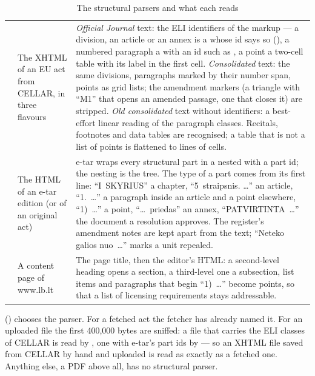 \begin{table}[H]
\caption{The structural parsers and what each reads}\label{tab:corpus:parsers}
\begin{tabularx}{\textwidth}{@{}L{20mm}L{35mm}Y@{}}
\toprule
{} &  &  \\
\midrule
{} & The XHTML of an EU act from CELLAR, in three flavours & \emph{Official Journal} text: the ELI identifiers of the markup --- a division, an article or an annex is a  whose id says so (), a numbered paragraph a  with an id such as , a point a two-cell table with its label in the first cell. \emph{Consolidated} text: the same divisions, paragraphs marked by their number span, points as grid lists; the amendment markers (a triangle with \enquote{M1} that opens an amended passage, one that closes it) are stripped. \emph{Old consolidated} text without identifiers: a best-effort linear reading of the paragraph classes. Recitals, footnotes and data tables are recognised; a table that is not a list of points is flattened to lines of cells. \\
 & The HTML of an e-tar edition (or of an original act) & e-tar wraps every structural part in a nested  with a part id; the nesting is the tree. The type of a part comes from its first line: \enquote{I~SKYRIUS} a chapter, \enquote{5~straipsnis. …} an article, \enquote{1.~…} a paragraph inside an article and a point elsewhere, \enquote{1)~…} a point, \enquote{…~priedas} an annex, \enquote{PATVIRTINTA~…} the document a resolution approves. The register's amendment notes are kept apart from the text; \enquote{Neteko galios nuo~…} marks a unit repealed. \\
 & A content page of www.lb.lt & The page title, then the editor's HTML: a second-level heading opens a section, a third-level one a subsection, list items and paragraphs that begin \enquote{1)~…} become points, so that a list of licensing requirements stays addressable. \\
\bottomrule
\end{tabularx}
\end{table}

 () chooses the parser. For a fetched act
the fetcher has already named it. For an uploaded file the first 400,000 bytes are sniffed: a
file that carries the ELI classes of CELLAR is read by , one with e-tar's part
ids by  --- so an XHTML file saved from CELLAR by hand and uploaded is read as
exactly as a fetched one. Anything else, a PDF above all, has no structural parser.

